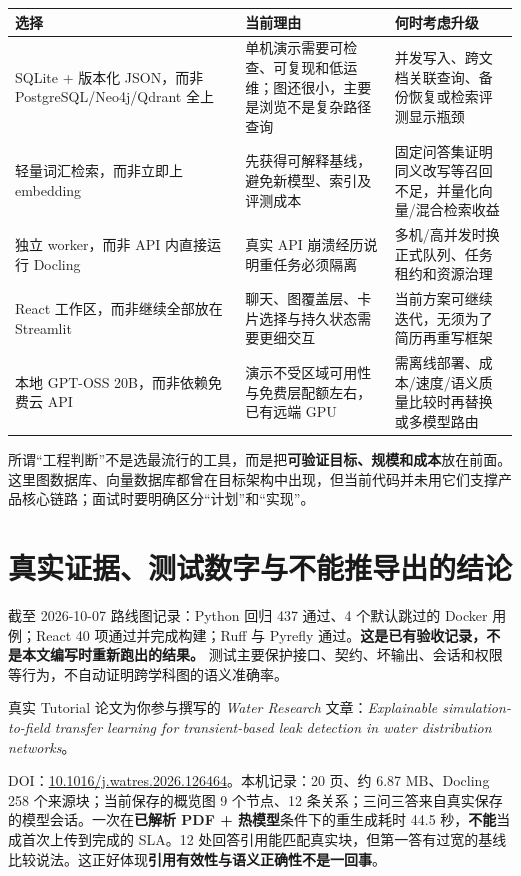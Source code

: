 \documentclass[UTF8,11pt,a4paper,fontset=fandol]{ctexart}
\newcommand{\term}[1]{\textbf{#1}}
\begin{document}
\begin{tabularx}{\textwidth}{@{}p{48mm}Y Y@{}}
\toprule
选择 & 当前理由 & 何时考虑升级 \\
\midrule
SQLite + 版本化 JSON，而非 PostgreSQL/Neo4j/Qdrant 全上 & 单机演示需要可检查、可复现和低运维；图还很小，主要是浏览不是复杂路径查询 & 并发写入、跨文档关联查询、备份恢复或检索评测显示瓶颈 \\
轻量词汇检索，而非立即上 embedding & 先获得可解释基线，避免新模型、索引及评测成本 & 固定问答集证明同义改写等召回不足，并量化向量/混合检索收益 \\
独立 worker，而非 API 内直接运行 Docling & 真实 API 崩溃经历说明重任务必须隔离 & 多机/高并发时换正式队列、任务租约和资源治理 \\
React 工作区，而非继续全部放在 Streamlit & 聊天、图覆盖层、卡片选择与持久状态需要更细交互 & 当前方案可继续迭代，无须为了简历再重写框架 \\
本地 GPT-OSS 20B，而非依赖免费云 API & 演示不受区域可用性与免费层配额左右，已有远端 GPU & 需离线部署、成本/速度/语义质量比较时再替换或多模型路由 \\
\bottomrule
\end{tabularx}

所谓“工程判断”不是选最流行的工具，而是把\term{可验证目标、规模和成本}放在前面。这里图数据库、向量数据库都曾在目标架构中出现，但当前代码并未用它们支撑产品核心链路；面试时要明确区分“计划”和“实现”。

\section{真实证据、测试数字与不能推导出的结论}

截至 2026-10-07 路线图记录：Python 回归 437 通过、4 个默认跳过的 Docker 用例；React 40 项通过并完成构建；Ruff 与 Pyrefly 通过。\term{这是已有验收记录，不是本文编写时重新跑出的结果。} 测试主要保护接口、契约、坏输出、会话和权限等行为，不自动证明跨学科图的语义准确率。

真实 Tutorial 论文为你参与撰写的 \emph{Water Research} 文章：\emph{Explainable simulation-to-field transfer learning for transient-based leak detection in water distribution networks}。\par
DOI：\href{https://doi.org/10.1016/j.watres.2026.126464}{10.1016/j.watres.2026.126464}。本机记录：20 页、约 6.87 MB、Docling 258 个来源块；当前保存的概览图 9 个节点、12 条关系；三问三答来自真实保存的模型会话。一次在\term{已解析 PDF + 热模型}条件下的重生成耗时 44.5 秒，\term{不能}当成首次上传到完成的 SLA。12 处回答引用能匹配真实块，但第一答有过宽的基线比较说法。这正好体现\term{引用有效性与语义正确性不是一回事}。
\end{document}
